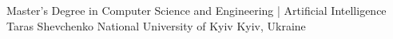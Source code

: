 
\begin{cventries}
\vspace{-.5\baselineskip}
\cventry
{Master's Degree in Computer Science and Engineering | Artificial Intelligence } %
{Taras Shevchenko National University of Kyiv} %
{Kyiv, Ukraine} %
{} %
{}

\end{cventries}